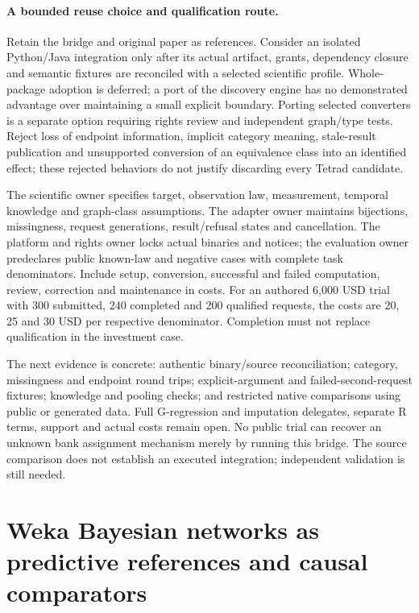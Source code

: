 \paragraph{A bounded reuse choice and qualification route.}
Retain the bridge and original paper as references. Consider an isolated
Python/Java integration only after its actual artifact, grants, dependency
closure and semantic fixtures are reconciled with a selected scientific
profile. Whole-package adoption is deferred; a port of the discovery engine
has no demonstrated advantage over maintaining a small explicit boundary.
Porting selected converters is a separate option requiring rights review and
independent graph/type tests. Reject loss of endpoint information, implicit
category meaning, stale-result publication and unsupported conversion of an
equivalence class into an identified effect; these rejected behaviors do not
justify discarding every Tetrad candidate.~\citep{exec24_pytetrad_choice}

The scientific owner specifies target, observation law, measurement, temporal
knowledge and graph-class assumptions. The adapter owner maintains bijections,
missingness, request generations, result/refusal states and cancellation. The
platform and rights owner locks actual binaries and notices; the evaluation
owner predeclares public known-law and negative cases with complete task
denominators. Include setup, conversion, successful and failed computation,
review, correction and maintenance in costs. For an authored 6,000 USD trial
with 300 submitted, 240 completed and 200 qualified requests, the costs are
20, 25 and 30 USD per respective denominator. Completion must not replace
qualification in the investment case.~\citep{exec24_pytetrad_choice}

The next evidence is concrete: authentic binary/source reconciliation;
category, missingness and endpoint round trips; explicit-argument and
failed-second-request fixtures; knowledge and pooling checks; and restricted
native comparisons using public or generated data. Full G-regression and
imputation delegates, separate R terms, support and actual costs remain open.
No public trial can recover an unknown bank assignment mechanism merely by
running this bridge. The source comparison does not establish an executed integration; independent validation is still needed.


\section{Weka Bayesian networks as predictive references and causal comparators}
\label{sec:exec24-weka-reuse}

